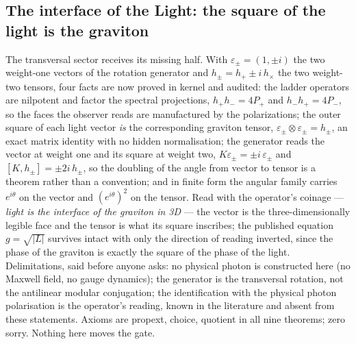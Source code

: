 \documentclass[11pt]{article}
\theoremstyle{definition}\newtheorem{deriv}{Derivation}
\begin{document}
\subsection*{The interface of the Light: the square of the light is the graviton}The transversal sector receives its missing half. With $\varepsilon_\pm = (1, \pm i)$ the two weight-one vectors of the rotation generator and $h_\pm = h_+ \pm i\,h_\times$ the two weight-two tensors, four facts are now proved in kernel and audited: the ladder operators are nilpotent and factor the spectral projections, $h_+ h_- = 4P_+$ and $h_- h_+ = 4P_-$, so the faces the observer reads are manufactured by the polarizations; the outer square of each light vector \emph{is} the corresponding graviton tensor, $\varepsilon_\pm \otimes \varepsilon_\pm = h_\pm$, an exact matrix identity with no hidden normalisation; the generator reads the vector at weight one and its square at weight two, $K\varepsilon_\pm = \pm i\,\varepsilon_\pm$ and $[K, h_\pm] = \pm 2i\,h_\pm$, so the doubling of the angle from vector to tensor is a theorem rather than a convention; and in finite form the angular family carries $e^{i\theta}$ on the vector and $(e^{i\theta})^2$ on the tensor. Read with the operator's coinage --- \emph{light is the interface of the graviton in 3D} --- the vector is the three-dimensionally legible face and the tensor is what its square inscribes; the published equation $g = \sqrt{|L|}$ survives intact with only the direction of reading inverted, since the phase of the graviton is exactly the square of the phase of the light. Delimitations, said before anyone asks: no physical photon is constructed here (no Maxwell field, no gauge dynamics); the generator is the transversal rotation, not the antilinear modular conjugation; the identification with the physical photon polarisation is the operator's reading, known in the literature and absent from these statements. Axioms are propext, choice, quotient in all nine theorems; zero sorry. Nothing here moves the gate.
\end{document}
